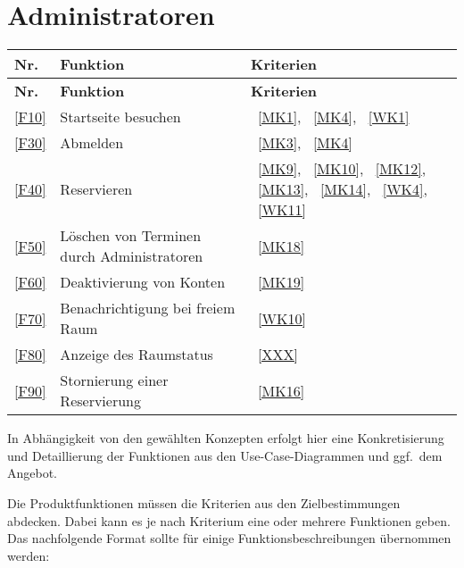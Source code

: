 \section{Administratoren}\label{sec:adminfunktionen}

\begin{table}[htbp]
    \centering
    \begin{tabularx}{\textwidth}{ l|X|l }
        \textbf{Nr.} & \textbf{Funktion} & \textbf{Kriterien} \\ \hline\hline
        \textbf{Nr.} & \textbf{Funktion} & \textbf{Kriterien} \\ \hline\hline
        \ref{F10} & Startseite besuchen &~\ref{MK1}, ~\ref{MK4}, ~\ref{WK1} \\
        \ref{F30} & Abmelden &~\ref{MK3}, ~\ref{MK4} \\
        \ref{F40} & Reservieren &~\ref{MK9}, ~\ref{MK10}, ~\ref{MK12}, ~\ref{MK13}, ~\ref{MK14}, ~\ref{WK4}, ~\ref{WK11} \\
        \ref{F50} & Löschen von Terminen durch Administratoren &~\ref{MK18} \\
        \ref{F60} & Deaktivierung von Konten &~\ref{MK19} \\
        \ref{F70} & Benachrichtigung bei freiem Raum &~\ref{WK10} \\
        \ref{F80} & Anzeige des Raumstatus &~\ref{XXX} \\
        \ref{F90} & Stornierung einer Reservierung &~\ref{MK16} \\
    \end{tabularx}
    \label{tab:adminfunctions}
\end{table}


\iffalse
In Abhängigkeit von den gewählten Konzepten erfolgt hier eine Konkretisierung
und Detaillierung der Funktionen aus den Use-Case-Diagrammen und ggf.\ dem
Angebot.

Die Produktfunktionen müssen die Kriterien aus den Zielbestimmungen abdecken.
Dabei kann es je nach Kriterium eine oder mehrere Funktionen geben.
Das nachfolgende Format sollte für einige Funktionsbeschreibungen übernommen werden:

